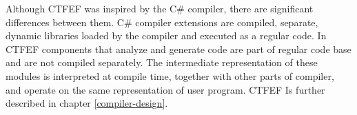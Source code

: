 Although CTFEF was inspired by the C\# compiler, there are significant differences between them.
C\# compiler extensions are compiled, separate, dynamic libraries loaded by the compiler and executed as a regular code.
In CTFEF components that analyze and generate code are part of regular code base and are not compiled separately.
The intermediate representation of these modules is interpreted at compile time, together with other parts of compiler, and operate on the same representation of user program.
CTFEF Is further described in chapter \ref{compiler-design}.

